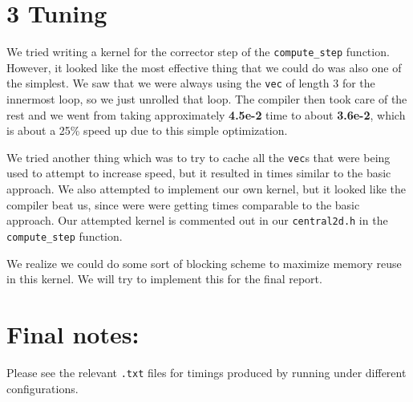 \documentclass[11pt]{article}
\begin{document}
    \section{3 Tuning}
         We tried writing a kernel for the corrector step of the \texttt{compute\_step} function. However, it looked like the most effective thing that we could do was also one of the simplest. We saw that we were always using the \texttt{vec} of length 3 for the innermost loop, so we just unrolled that loop. The compiler then took care of the rest and we went from taking approximately \textbf{4.5e-2} time to about \textbf{3.6e-2}, which is about a 25\% speed up due to this simple optimization.

         We tried another thing which was to try to cache all the \texttt{vec}s that were being used to attempt to increase speed, but it resulted in times similar to the basic approach. We also attempted to implement our own kernel, but it looked like the compiler beat us, since were were getting times comparable to the basic approach. Our attempted kernel is commented out in our \texttt{central2d.h} in the \texttt{compute\_step} function. 

         We realize we could do some sort of blocking scheme to maximize memory reuse in this kernel. We will try to implement this for the final report.

    \section{Final notes:}
        Please see the relevant \texttt{.txt} files for timings produced by running under different configurations.
\end{document}
